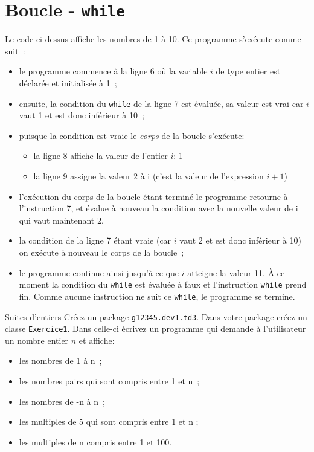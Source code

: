 \documentclass[a4paper,11pt]{style-esi/td}
\begin{document}

\section{Boucle - \texttt{while}}

	Le code ci-dessus affiche les nombres de 1 à 10.
	Ce programme s'exécute comme suit~:
	\begin{itemize}
		\item  le programme commence à la ligne 6 où la variable $i$ de type entier est déclarée et initialisée à 1~;
		\item  ensuite, la condition du \texttt{while} de la ligne 7 est évaluée, sa valeur est vrai car $i$ vaut 1 et est donc inférieur à 10~;
		\item puisque la condition est vraie le \emph{corps} de la boucle s'exécute:
			\begin{itemize}
				\item la ligne 8 affiche la valeur de l'entier $i$: 1
				\item la ligne 9 assigne la valeur 2 à i (c'est la valeur de l'expression $i+1$)
			\end{itemize}
		\item l'exécution du corps de la boucle étant terminé le programme retourne à l'instruction 7, 
			et évalue à nouveau la condition avec la nouvelle valeur de i qui vaut maintenant 2.
		\item  la condition de la ligne 7 étant vraie (car $i$ vaut 2 et est donc inférieur à 10) on exécute à nouveau le corps de la boucle~;
		\item le programme continue ainsi jusqu'à ce que $i$ atteigne la valeur 11. 
			\`A ce moment la condition du \texttt{while} est évaluée à faux et l'instruction 
			\texttt{while} prend fin.
			Comme aucune instruction ne suit ce \texttt{while}, le programme se termine.
	\end{itemize}

 
	\begin{Exercice}{Suites d'entiers}	
		Créez un package \texttt{g12345.dev1.td3}.
		Dans votre package créez un classe \texttt{Exercice1}.
		Dans celle-ci écrivez un programme qui demande à l'utilisateur un nombre entier $n$ et affiche:
		\begin{itemize}
			\item les nombres de 1 à n~;
			\item les nombres pairs qui sont compris entre 1 et n~;
			\item les nombres de -n à n~;
			\item les multiples de 5 qui sont compris entre 1 et n ;
			\item les multiples de n compris entre 1 et 100.
		\end{itemize}
	\end{Exercice}
\end{document}
